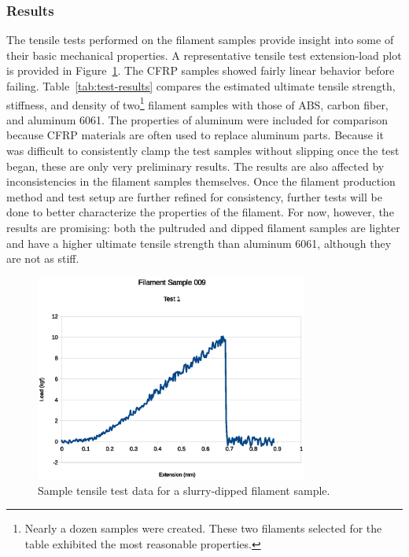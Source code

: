 \clearpage

\subsubsection{Results}

\indent

The tensile tests performed on the filament samples provide insight into some of their basic mechanical properties. A representative tensile test extension-load plot is provided in Figure~\ref{fig:instron-sample}. The CFRP samples showed fairly linear behavior before failing. Table~\ref{tab:test-results} compares the estimated ultimate tensile strength, stiffness, and density of two\footnote{Nearly a dozen samples were created. These two filaments selected for the table exhibited the most reasonable properties.} filament samples with those of ABS, carbon fiber, and aluminum 6061. The properties of aluminum were included for comparison because CFRP materials are often used to replace aluminum parts. Because it was difficult to consistently clamp the test samples without slipping once the test began, these are only very preliminary results. The results are also affected by inconsistencies in the filament samples themselves. Once the filament production method and test setup are further refined for consistency, further tests will be done to better characterize the properties of the filament. For now, however, the results are promising: both the pultruded and dipped filament samples are lighter and have a higher ultimate tensile strength than aluminum 6061, although they are not as stiff.\\

\begin{figure}[htp]
    \centering
    \includegraphics[width=0.8\textwidth]{./figures/009T1-instron-data}
    \caption{Sample tensile test data for a slurry-dipped filament sample.}
    \label{fig:instron-sample}
\end{figure}

